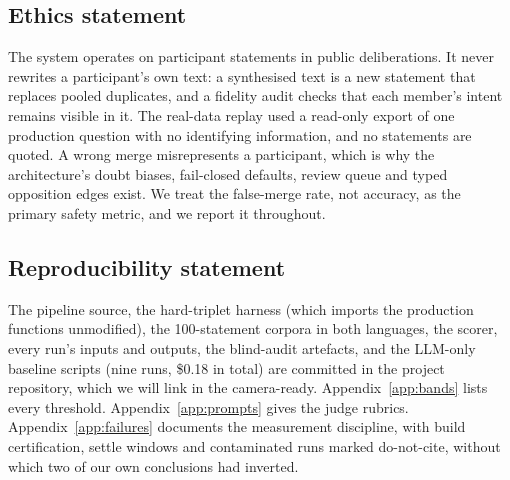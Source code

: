 \documentclass{article}
\begin{document}
\subsection*{Ethics statement}
The system operates on participant statements in public deliberations. It never rewrites a participant's own text: a synthesised text is a new statement that replaces pooled duplicates, and a fidelity audit checks that each member's intent remains visible in it. The real-data replay used a read-only export of one production question with no identifying information, and no statements are quoted. A wrong merge misrepresents a participant, which is why the architecture's doubt biases, fail-closed defaults, review queue and typed opposition edges exist. We treat the false-merge rate, not accuracy, as the primary safety metric, and we report it throughout.

\subsection*{Reproducibility statement}
The pipeline source, the hard-triplet harness (which imports the production functions unmodified), the 100-statement corpora in both languages, the scorer, every run's inputs and outputs, the blind-audit artefacts, and the LLM-only baseline scripts (nine runs, \$0.18 in total) are committed in the project repository, which we will link in the camera-ready. Appendix~\ref{app:bands} lists every threshold. Appendix~\ref{app:prompts} gives the judge rubrics. Appendix~\ref{app:failures} documents the measurement discipline, with build certification, settle windows and contaminated runs marked do-not-cite, without which two of our own conclusions had inverted.




\appendix
\end{document}
